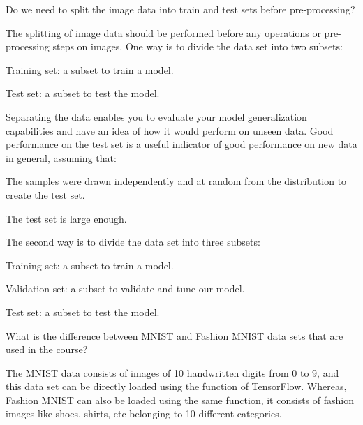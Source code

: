 	\begin{qanda}
		\begin{question}
Do we need to split the image data into train and test sets before pre-processing?
		\end{question}
		\begin{answer}
The splitting of image data should be performed before any operations or pre-processing steps on images.  One way is to divide the data set into two subsets:
	\begin{numberedlist}
		\item Training set: a subset to train a model.
		\item Test set: a subset to test the model.
	\end{numberedlist}

Separating the data enables you to evaluate your model generalization capabilities and have an idea of how it would perform on unseen data.  Good performance on the test set is a useful indicator of good performance on new data in general, assuming that:
	\begin{bulletedlist}
		\item The samples were drawn independently and at random from the distribution to create the test set.
		\item The test set is large enough.	
	\end{bulletedlist}

The second way is to divide the data set into three subsets:
	\begin{numberedlist}
		\item Training set: a subset to train a model.
		\item Validation set: a subset to validate and tune our model.
		\item Test set: a subset to test the model.
	\end{numberedlist}
		\end{answer}
	\end{qanda}

	\begin{qanda}
		\begin{question}
What is the difference between MNIST and Fashion MNIST data sets that are used in the course?
		\end{question}
		\begin{answer}
The MNIST data consists of images of 10 handwritten digits from 0 to 9, and this data set can be directly loaded using the  function of TensorFlow.  Whereas, Fashion MNIST can also be loaded using the same  function, it consists of fashion images like shoes, shirts, etc belonging to 10 different categories.
		\end{answer}
	\end{qanda}

